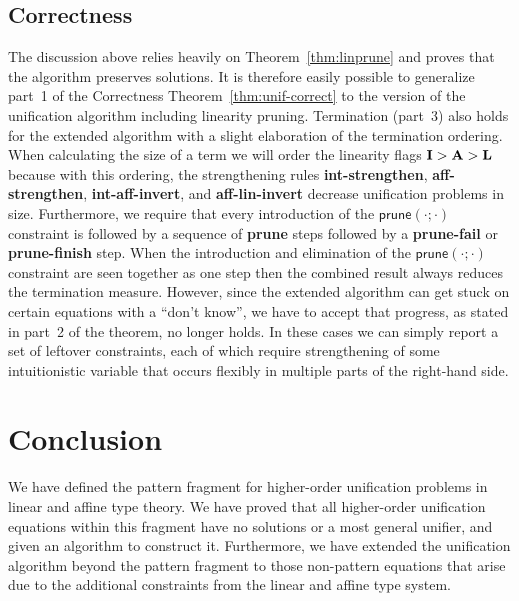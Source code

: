 \documentclass{eptcs}
\newcommand\fI{\textup{$\mathbf{I}$}}
\newcommand\fA{\textup{$\mathbf{A}$}}
\newcommand\fL{\textup{$\mathbf{L}$}}
\theoremstyle{definition}
\begin{document}
\subsection{Correctness}
The discussion above relies heavily on
Theorem~\ref{thm:linprune} and proves that the algorithm preserves
solutions.   It is therefore easily possible to generalize part~1 of the Correctness
Theorem~\ref{thm:unif-correct} to the version of the unification
algorithm including linearity pruning.
Termination (part~3) also holds for the extended algorithm with a slight
elaboration of the termination ordering.  When calculating the size of
a term we will order the linearity flags $\fI>\fA>\fL$ because with
this ordering,
the strengthening rules \textbf{int-strengthen},
\textbf{aff-strengthen}, \textbf{int-aff-invert}, and
\textbf{aff-lin-invert} decrease unification problems in size.
Furthermore, we require
that every introduction of the $\textsf{prune}(\cdot;\cdot)$ constraint is followed by
a sequence of \textbf{prune} steps followed by a \textbf{prune-fail} or
\textbf{prune-finish} step.  When the introduction and elimination of
the $\textsf{prune}(\cdot;\cdot)$ constraint are seen together as one step then the
combined result  always reduces the termination measure.
However, since the extended algorithm can get
stuck on certain equations with a ``don't know'', we have to
accept that progress, as stated in part~2 of the theorem, no
longer holds.  In these cases we can simply report a set of leftover
constraints, each of which require strengthening of some intuitionistic
variable that occurs flexibly in multiple parts of the right-hand side.



\section{Conclusion}
We have defined the pattern fragment for higher-order unification problems
in linear and affine type theory.  We have proved that all higher-order
unification equations within this fragment have no solutions or a most
general unifier, and given an algorithm to construct it.  Furthermore,
we have extended the unification algorithm beyond the pattern fragment
to those non-pattern equations that arise due to the additional
constraints from the linear and affine type system.




\end{document}
